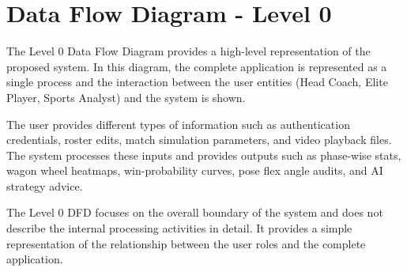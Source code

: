 \section{Data Flow Diagram - Level 0}
The Level 0 Data Flow Diagram provides a high-level representation of the proposed system. In this diagram, the complete application is represented as a single process and the interaction between the user entities (Head Coach, Elite Player, Sports Analyst) and the system is shown.

The user provides different types of information such as authentication credentials, roster edits, match simulation parameters, and video playback files. The system processes these inputs and provides outputs such as phase-wise stats, wagon wheel heatmaps, win-probability curves, pose flex angle audits, and AI strategy advice.

The Level 0 DFD focuses on the overall boundary of the system and does not describe the internal processing activities in detail. It provides a simple representation of the relationship between the user roles and the complete application.

